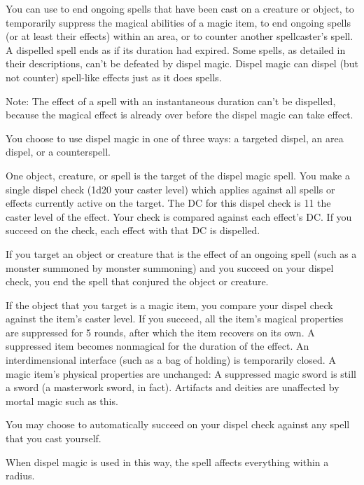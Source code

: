 \spellrng{\rngmed}
\begin{spelleffect}
  You can use  to end ongoing spells that have been cast on a creature or object, to temporarily suppress the magical abilities of a magic item, to end ongoing spells (or at least their effects) within an area, or to counter another spellcaster's spell. A dispelled spell ends as if its duration had expired. Some spells, as detailed in their descriptions, can't be defeated by dispel magic. Dispel magic can dispel (but not counter) spell-like effects just as it does spells.
  \par Note: The effect of a spell with an instantaneous duration can't be dispelled, because the magical effect is already over before the dispel magic can take effect. 
  \par You choose to use dispel magic in one of three ways: a targeted dispel, an area dispel, or a counterspell.

  \par {} One object, creature, or spell is the target of the dispel magic spell. You make a single dispel check (1d20 \add your caster level) which applies against all spells or effects currently active on the target. The DC for this dispel check is 11 \add the caster level of the effect. Your check is compared against each effect's DC. If you succeed on the check, each effect with that DC is dispelled.

  \par If you target an object or creature that is the effect of an ongoing spell (such as a monster summoned by monster summoning) and you succeed on your dispel check, you end the spell that conjured the object or creature.
  \par If the object that you target is a magic item, you compare your dispel check against the item's caster level. If you succeed, all the item's magical properties are suppressed for 5 rounds, after which the item recovers on its own. A suppressed item becomes nonmagical for the duration of the effect. An interdimensional interface (such as a bag of holding) is temporarily closed. A magic item's physical properties are unchanged: A suppressed magic sword is still a sword (a masterwork sword, in fact). Artifacts and deities are unaffected by mortal magic such as this.
  \par You may choose to automatically succeed on your dispel check against any spell that you cast yourself.
  \par {} When dispel magic is used in this way, the spell affects everything within a \areamed radius.


\end{spelleffect}
